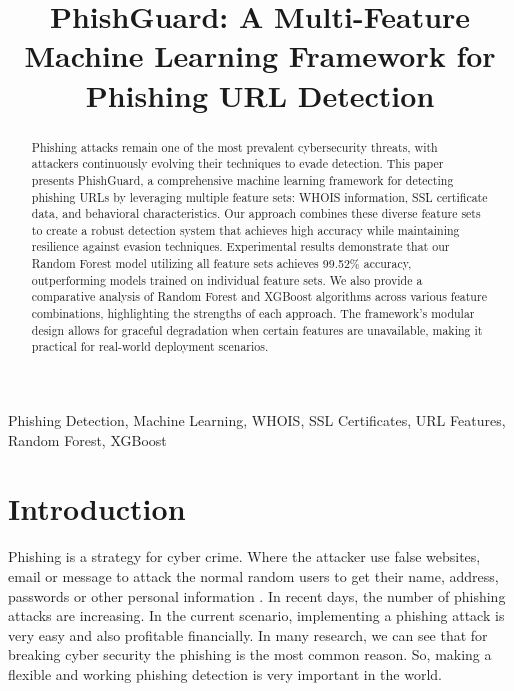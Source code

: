 \documentclass[conference]{IEEEtran}
\begin{document}
\title{PhishGuard: A Multi-Feature Machine Learning Framework for Phishing URL Detection}

\author{
}

\maketitle

\begin{abstract}
Phishing attacks remain one of the most prevalent cybersecurity threats, with attackers continuously evolving their techniques to evade detection. This paper presents PhishGuard, a comprehensive machine learning framework for detecting phishing URLs by leveraging multiple feature sets: WHOIS information, SSL certificate data, and behavioral characteristics. Our approach combines these diverse feature sets to create a robust detection system that achieves high accuracy while maintaining resilience against evasion techniques. Experimental results demonstrate that our Random Forest model utilizing all feature sets achieves 99.52\% accuracy, outperforming models trained on individual feature sets. We also provide a comparative analysis of Random Forest and XGBoost algorithms across various feature combinations, highlighting the strengths of each approach. The framework's modular design allows for graceful degradation when certain features are unavailable, making it practical for real-world deployment scenarios.
\end{abstract}

\begin{IEEEkeywords}
Phishing Detection, Machine Learning, WHOIS, SSL Certificates, URL Features, Random Forest, XGBoost
\end{IEEEkeywords}

\section{Introduction}
Phishing is a strategy for cyber crime. Where the attacker use false websites, email or message to attack the normal random users to get their name, address, passwords or other personal information \cite{wikipedia2025phishing}. In recent days, the number of phishing attacks are increasing. In the current scenario, implementing a phishing attack is very easy and also profitable financially\cite{wired2021aipishing}. In many research, we can see that for breaking cyber security the phishing is the most common reason\cite{oni2024phishing}. So, making a flexible and working phishing detection is very important in the world. \\
\end{document}
